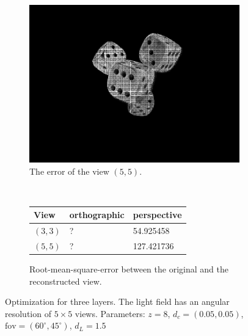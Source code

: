 \documentclass[11pt,a4paper,titlepage]{article}
\begin{document}
\begin{figure}[h]
\begin{subfigure}[t]{0.4\textwidth}
		\includegraphics[width=\textwidth]{results/dice_perspective_rec_3Layers_r=0/custom_view_error.png}
		\caption{The error of the view $\left( 5, 5 \right)$.}
	\end{subfigure}%
	\\
	\begin{subfigure}[t]{0.4\textwidth}
		\begin{tabular}{|l|l|l|}
			\hline 
			View & orthographic & perspective \\ 
			\hline 
			$\left(3, 3\right)$ & ? & 54.925458 \\ 
			\hline 
			$\left(5, 5\right)$ & ? & 127.421736 \\ 
			\hline 
		\end{tabular} 
		\caption{Root-mean-square-error between the original and the reconstructed view.}
	\end{subfigure}
	\caption{Optimization for three layers. The light field has an angular resolution of $5\times 5$ views. Parameters: $z = 8$, $d_c = \left( 0.05, 0.05 \right)$, $\text{fov} = \left( 60^\circ, 45^\circ \right)$, $d_L = 1.5$}
\end{figure}
\end{document}
